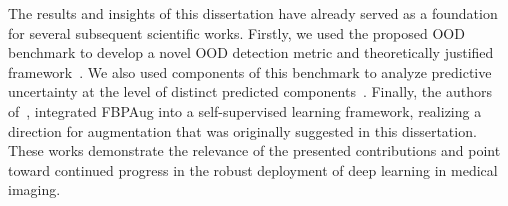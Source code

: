 The results and insights of this dissertation have already served as a foundation for several subsequent scientific works. Firstly, we used the proposed OOD benchmark to develop a novel OOD detection metric and theoretically justified framework~\cite{vasiliuk2023redesigning}. We also used components of this benchmark to analyze predictive uncertainty at the level of distinct predicted components~\cite{vasiliuk2022exploring}. Finally, the authors of~\cite{goncharov2023vox2vec}, integrated FBPAug into a self-supervised learning framework, realizing a direction for augmentation that was originally suggested in this dissertation. These works demonstrate the relevance of the presented contributions and point toward continued progress in the robust deployment of deep learning in medical imaging.

